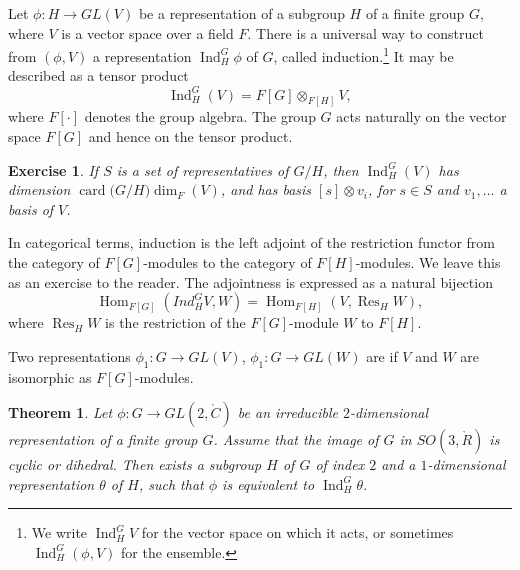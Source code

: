 \documentclass{amsart}
\newtheorem{theorem}[equation]{Theorem}
\newtheorem{exercise}{Exercise}
\def\card#1{\op{card}{#1}}
\def\op#1{{\operatorname{#1}}}
\def\CC{\ring{C}}
\def\RR{\ring{R}}
\begin{document}
Let $\phi:H\to GL(V)$ be a representation of a subgroup $H$ of a
finite group $G$, where $V$ is a vector space over a field $F$.  There
is a universal way to construct from $(\phi,V)$ a representation $\op{Ind}_H^G\phi$ of
$G$, called induction.\footnote{We write $\op{Ind}_H^G V$ for the vector space on
which it acts, or sometimes $\op{Ind}_H^G (\phi,V)$ for the ensemble.}  
It may be described as a tensor product
\[
\op{Ind}_H^G(V) = F[G]\otimes_{F[H]} V,
\]
where $F[\cdot]$ denotes the group algebra.  The group $G$ acts
naturally on the vector space $F[G]$ and hence on the tensor product.

\begin{exercise}
If $S$ is a set of representatives of $G/H$, then $\op{Ind}_H^G(V)$
has dimension $\card(G/H)\dim_F(V)$, and has basis $[s]\otimes v_i$,
for $s\in S$ and $v_1,\ldots $ a basis of $V$.
\end{exercise}

In categorical terms, induction is the left adjoint of the restriction functor
from the category of  $F[G]$-modules to the category of  $F[H]$-modules.
We leave this as an exercise to the reader.  The adjointness is expressed as a 
natural bijection
\begin{equation}\label{eqn:adjoint}
\op{Hom}_{F[G]}(Ind_H^G V,W) = \op{Hom}_{F[H]}(V,\op{Res}_H W),
\end{equation}
where $\op{Res}_H W$ is the restriction of the $F[G]$-module $W$ to $F[H]$.

Two representations $\phi_1:G\to GL(V)$, $\phi_1:G\to GL(W)$ are
 if $V$ and $W$ are isomorphic as $F[G]$-modules.

\begin{theorem}
  Let $\phi:G\to GL(2,\CC)$ be an irreducible $2$-dimensional
  representation of a finite group $G$.  Assume that the image of $G$
  in $SO(3,\RR)$ is cyclic or dihedral.  Then exists a subgroup
  $H$ of $G$ of index $2$ and a $1$-dimensional representation
  $\theta$ of $H$, such that $\phi$ is equivalent to
  $\op{Ind}_H^G\theta$.
\end{theorem}
\end{document}
